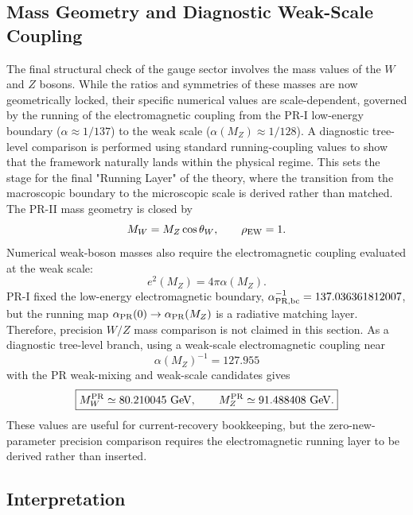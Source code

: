 \documentclass[11pt]{article}
\begin{document}
\subsection{Mass Geometry and Diagnostic Weak-Scale Coupling}
\label{sec:pr2_mass_geometry_diagnostic_coupling}
The final structural check of the gauge sector involves the mass values of the $W$ and $Z$ bosons. While the ratios and symmetries of these masses are now geometrically locked, their specific numerical values are scale-dependent, governed by the running of the electromagnetic coupling from the PR-I low-energy boundary ($\alpha \approx 1/137$) to the weak scale ($\alpha(M_Z) \approx 1/128$). A diagnostic tree-level comparison is performed using standard running-coupling values to show that the framework naturally lands within the physical regime. This sets the stage for the final "Running Layer" of the theory, where the transition from the macroscopic boundary to the microscopic scale is derived rather than matched. The PR-II mass geometry is closed by
\begin{equation}
M_W
=
M_Z\cos\theta_W,
\qquad
\rho_{\rm EW}=1.
\end{equation}
Numerical weak-boson masses also require the electromagnetic coupling evaluated at the weak scale:
\begin{equation}
e^2(M_Z)
=
4\pi\alpha(M_Z).
\end{equation}
PR-I fixed the low-energy electromagnetic boundary, $\alpha_{\rm PR,bc}^{-1}=137.036361812007$, but the running map $\alpha_{\rm PR}(0)\rightarrow\alpha_{\rm PR}(M_Z)$ is a radiative matching layer. Therefore, precision \(W/Z\) mass comparison is not claimed in this section. As a diagnostic tree-level branch, using a weak-scale electromagnetic coupling near
\begin{equation}
\boxed{
\alpha(M_Z)^{-1}=127.955
}
\end{equation}
with the PR weak-mixing and weak-scale candidates gives
\begin{equation}
\boxed{
M_W^{\rm PR}
\simeq
80.210045\ {\rm GeV},
\qquad
M_Z^{\rm PR}
\simeq
91.488408\ {\rm GeV}.
}
\end{equation}
These values are useful for current-recovery bookkeeping, but the zero-new-parameter precision comparison requires the electromagnetic running layer to be derived rather than inserted.

\subsection{Interpretation}
\label{sec:pr2_current_recovery_interpretation}
\end{document}
